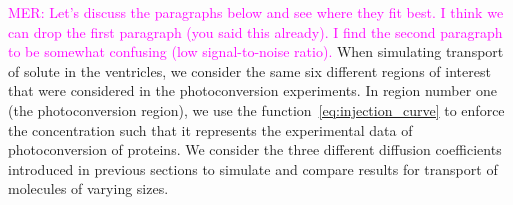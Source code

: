\documentclass[fleqn]{wlscirep}
\newcommand{\Gs}{\Gamma_{s}}
\newcommand{\Gc}{\Gamma_{c}}
\newcommand{\Gp}{\Gamma_{p}}
\newcommand{\nn}{\mathbf{n}}
\newcommand{\uu}{\mathbf{u}}
\newcommand{\bsig}{\bm{\sigma}}
\newcommand{\bsigpar}{\hat{\bsig}_{\parallel}}
\newcommand{\btau}{\bm{\tau}}
\newcommand{\mer}[1]{\textcolor{magenta}{#1}}
\begin{document}

\mer{MER: Let's discuss the paragraphs below and see where they fit best. I think we can drop the first paragraph (you said this already). I find the second paragraph to be somewhat confusing (low signal-to-noise ratio).}
When simulating transport of solute in the ventricles, we consider the same six different regions of interest that were considered in the photoconversion experiments. In region number one (the photoconversion region), we use the function~\eqref{eq:injection_curve} to enforce the concentration such that it represents the experimental data of photoconversion of proteins. We consider the three different diffusion coefficients introduced in previous sections to simulate and compare results for transport of molecules of varying sizes.
\end{document}
